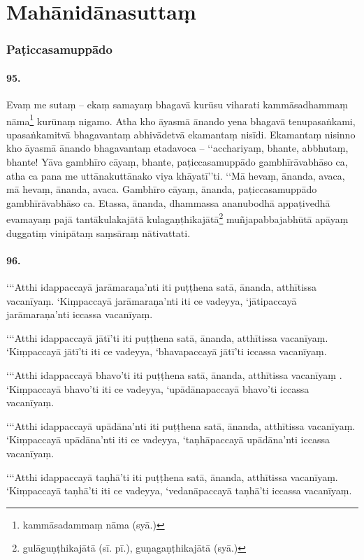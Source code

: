 \section{Mahānidānasuttaṃ}

\subsubsection{Paṭiccasamuppādo}

\paragraph{95.} Evaṃ me sutaṃ – ekaṃ samayaṃ bhagavā kurūsu viharati kammāsadhammaṃ nāma\footnote{kammāsadammaṃ nāma (syā.)} kurūnaṃ nigamo. Atha kho āyasmā ānando yena bhagavā tenupasaṅkami, upasaṅkamitvā bhagavantaṃ abhivādetvā ekamantaṃ nisīdi. Ekamantaṃ nisinno kho āyasmā ānando bhagavantaṃ etadavoca – ‘‘acchariyaṃ, bhante, abbhutaṃ, bhante! Yāva gambhīro cāyaṃ, bhante, paṭiccasamuppādo gambhīrāvabhāso ca, atha ca pana me uttānakuttānako viya khāyatī’’ti. ‘‘Mā hevaṃ, ānanda, avaca, mā hevaṃ, ānanda, avaca. Gambhīro cāyaṃ, ānanda, paṭiccasamuppādo gambhīrāvabhāso ca. Etassa, ānanda, dhammassa ananubodhā appaṭivedhā evamayaṃ pajā tantākulakajātā kulagaṇṭhikajātā\footnote{gulāguṇṭhikajātā (sī. pī.), guṇagaṇṭhikajātā (syā.)} muñjapabbajabhūtā apāyaṃ duggatiṃ vinipātaṃ saṃsāraṃ nātivattati.

\paragraph{96.} ‘‘‘Atthi idappaccayā jarāmaraṇa’nti iti puṭṭhena satā, ānanda, atthītissa vacanīyaṃ. ‘Kiṃpaccayā jarāmaraṇa’nti iti ce vadeyya, ‘jātipaccayā jarāmaraṇa’nti iccassa vacanīyaṃ.

‘‘‘Atthi idappaccayā jātī’ti iti puṭṭhena satā, ānanda, atthītissa vacanīyaṃ. ‘Kiṃpaccayā jātī’ti iti ce vadeyya, ‘bhavapaccayā jātī’ti iccassa vacanīyaṃ.

‘‘‘Atthi idappaccayā bhavo’ti iti puṭṭhena satā, ānanda, atthītissa vacanīyaṃ . ‘Kiṃpaccayā bhavo’ti iti ce vadeyya, ‘upādānapaccayā bhavo’ti iccassa vacanīyaṃ.

‘‘‘Atthi idappaccayā upādāna’nti iti puṭṭhena satā, ānanda, atthītissa vacanīyaṃ. ‘Kiṃpaccayā upādāna’nti iti ce vadeyya, ‘taṇhāpaccayā upādāna’nti iccassa vacanīyaṃ.

‘‘‘Atthi idappaccayā taṇhā’ti iti puṭṭhena satā, ānanda, atthītissa vacanīyaṃ. ‘Kiṃpaccayā taṇhā’ti iti ce vadeyya, ‘vedanāpaccayā taṇhā’ti iccassa vacanīyaṃ.

